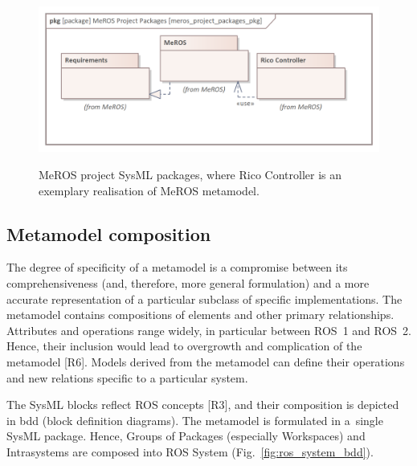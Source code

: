 \documentclass[11pt,oneside,a4paper]{article}
\begin{document}
		
	\begin{figure}[H]
		\centering
		\begin{center}
			{\includegraphics[scale=1.0]{img/meros_project_packages_pkg.png}}
		\end{center}
		\caption{MeROS project SysML packages, where Rico Controller is an exemplary realisation of MeROS metamodel.} 
		\label{fig:meros_project_packages_pkg}
	\end{figure}
	
\subsection{Metamodel composition}
\label{sec:metamodel-composition}

	The degree of specificity of a metamodel is a compromise between its comprehensiveness (and, therefore, more general formulation) and a more accurate representation of a particular subclass of specific implementations. The metamodel contains compositions of elements and other primary relationships. Attributes and operations range widely, in particular between ROS~1 and ROS~2. Hence, their inclusion would lead to overgrowth and complication of the metamodel [R6]. Models derived from the metamodel can define their operations and new relations specific to a particular system. 
	
	The SysML blocks reflect ROS concepts [R3], and their composition is depicted in bdd (block definition diagrams). The metamodel is formulated in a~single SysML package. Hence, Groups of Packages (especially Workspaces) and Intrasystems are composed into ROS System (Fig.~\ref{fig:ros_system_bdd}). 
	
\end{document}
